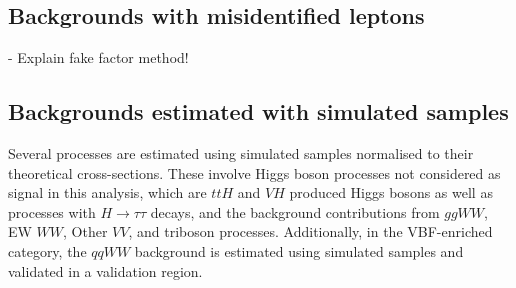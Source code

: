
\subsection{Backgrounds with misidentified leptons}

- Explain fake factor method!


\subsection{Backgrounds estimated with simulated samples}
Several processes are estimated using simulated samples normalised to their theoretical cross-sections. These involve Higgs boson processes not considered as signal in this analysis, which are $ttH$ and $VH$ produced Higgs bosons as well as processes with $H\to\tau\tau$ decays, and the background contributions from $ggWW$, EW $WW$, Other $VV$, and triboson processes. Additionally, in the VBF-enriched \TwoJet category, the $qqWW$ background is estimated using simulated samples and validated in a validation region. 


